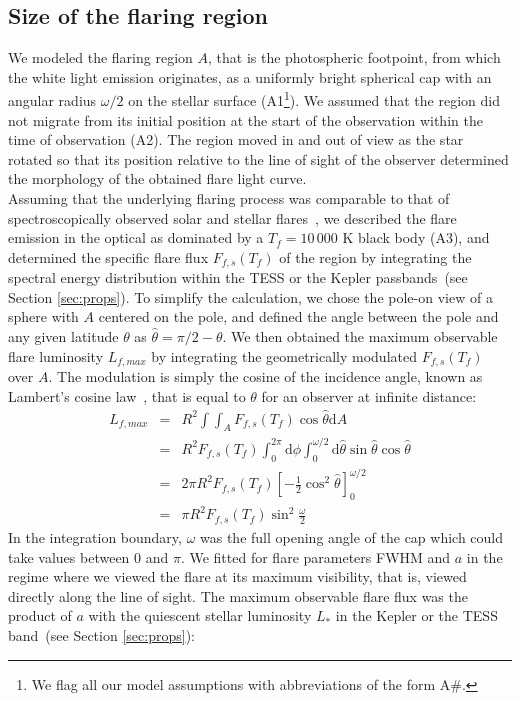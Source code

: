 \documentclass[fleqn,usenatbib,letters]{mnras}%
\begin{document}
\subsection{Size of the flaring region}
\label{ssec:flaringregion}
We modeled the flaring region $A$, that is the photospheric footpoint, from which the white light emission originates, as a uniformly bright spherical cap with an angular radius $\omega/2$ on the stellar surface (A1\footnote{We flag all our model assumptions with abbreviations of the form A\#.}). We assumed that the region did not migrate from its initial position at the start of the observation within the time of observation (A2). The region moved in and out of view as the star rotated so that its position relative to the line of sight of the observer determined the morphology of the obtained flare light curve.
\\
Assuming that the underlying flaring process was comparable to that of spectroscopically observed solar and stellar flares~\citep{hawley1992, kretzschmar2011}, we described the flare emission in the optical as dominated by a $T_f=10\,000$ K black body (A3), and determined the specific flare flux $F_{f,s}(T_f)$ of the region by integrating the spectral energy distribution within the TESS or the Kepler passbands~(see Section \ref{sec:props}). To simplify the calculation, we chose the pole-on view of a sphere with $A$ centered on the pole, and defined the angle between the pole and any given latitude $\theta$ as $\hat\theta=\pi/2 - \theta$. We then obtained the maximum observable flare luminosity $L_{f,max}$ by integrating the geometrically modulated $F_{f,s}(T_f)$ over $A$. The modulation is simply the cosine of the incidence angle, known as Lambert's cosine law~\citep{lambert1892}, that is equal to $\theta$ for an observer at infinite distance:
\begin{eqnarray}
    L_{f,max}&=&R^2  \displaystyle\int\int_A F_{f,s}(T_f) \cos\hat\theta \mathrm {d}A\\
    &=& R^2 F_{f,s}(T_f) \displaystyle\int_{0}^{2\pi}\mathrm{d}\phi\int_{0}^{\omega/2}\mathrm{d}\hat\theta \sin\hat\theta\cos\hat\theta\\
    &=& 2\pi R^2 F_{f,s}(T_f)\left[-\tfrac{1}{2} \cos^2\hat\theta\right]^{\omega/2}_0 \\
    &=& \pi R^2 F_{f,s}(T_f) \sin^2\tfrac{\omega}{2}
    \label{eq:Lmax1}
\end{eqnarray}
In the integration boundary, $\omega$ was the full opening angle of the cap which could take values between 0 and $\pi$. We fitted for flare parameters FWHM and $a$ in the regime where we viewed the flare at its maximum visibility, that is, viewed directly along the line of sight. The maximum observable flare flux was the product of $a$ with the quiescent stellar luminosity $L_{*}$ in the Kepler or the TESS band~(see Section \ref{sec:props}):
\end{document}
